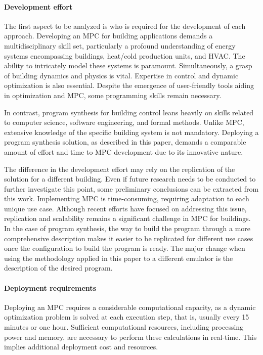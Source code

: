 \paragraph{Development effort}
The first aspect to be analyzed is who is required for the development of each approach. 
Developing an MPC for building applications demands a multidisciplinary skill set, particularly a profound understanding of energy systems encompassing buildings, heat/cold production units, and HVAC. The ability to intricately model these systems is paramount. Simultaneously, a grasp of building dynamics and physics is vital. Expertise in control and dynamic optimization is also essential. Despite the emergence of user-friendly tools aiding in optimization and MPC, some programming skills remain necessary. 

In contrast, program synthesis for building control leans heavily on skills related to computer science, software engineering, and formal methods. Unlike MPC, extensive knowledge of the specific building system is not mandatory. Deploying a program synthesis solution, as described in this paper, demands a comparable amount of effort and time to MPC development due to its innovative nature.

The difference in the development effort may rely on the replication of the solution for a different building. Even if future research needs to be conducted to further investigate this point, some preliminary conclusions can be extracted from this work. Implementing MPC is time-consuming, requiring adaptation to each unique use case. Although recent efforts have focused on addressing this issue, replication and scalability remains a significant challenge in MPC for buildings. In the case of program synthesis, the way to build the program through a more comprehensive description makes it easier to be replicated for different use cases once the configuration to build the program is ready. The major change when using the methodology applied in this paper to a different emulator is the description of the desired program.

\paragraph{Deployment requirements}
Deploying an MPC requires a considerable computational capacity, as a dynamic optimization problem is solved at each execution step, that is, usually every 15 minutes or one hour. Sufficient computational resources, including processing power and memory, are necessary to perform these calculations in real-time. This implies additional deployment cost and resources.

